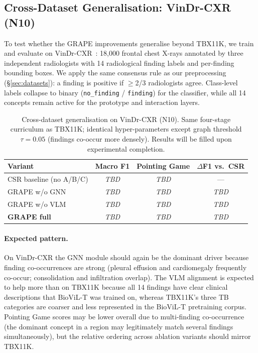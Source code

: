 \documentclass{article}
\begin{document}
\subsection{Cross-Dataset Generalisation: VinDr-CXR (N10)}
\label{sec:n10}

To test whether the GRAPE improvements generalise beyond TBX11K, we train and evaluate on VinDr-CXR~\cite{vindrcxr2022}: 18{,}000 frontal chest X-rays annotated by three independent radiologists with 14 radiological finding labels and per-finding bounding boxes.
We apply the same consensus rule as our preprocessing (§\ref{sec:datasets}): a finding is positive if $\geq$2/3 radiologists agree.
Class-level labels collapse to binary (\texttt{no\_finding} / \texttt{finding}) for the classifier, while all 14 concepts remain active for the prototype and interaction layers.

\begin{table}[t]
  \caption{Cross-dataset generalisation on VinDr-CXR (N10).
           Same four-stage curriculum as TBX11K; identical hyper-parameters except
           graph threshold $\tau=0.05$ (findings co-occur more densely).
           Results will be filled upon experimental completion.}
  \label{tab:n10}
  \centering
  \begin{tabular}{lccc}
    \toprule
    Variant & Macro F1 & Pointing Game & $\Delta$F1 vs.\ CSR \\
    \midrule
    CSR baseline (no A/B/C)   & \textit{TBD} & \textit{TBD} & — \\
    GRAPE w/o GNN             & \textit{TBD} & \textit{TBD} & \textit{TBD} \\
    GRAPE w/o VLM             & \textit{TBD} & \textit{TBD} & \textit{TBD} \\
    \textbf{GRAPE full}       & \textit{TBD} & \textit{TBD} & \textit{TBD} \\
    \bottomrule
  \end{tabular}
\end{table}

\paragraph{Expected pattern.}
On VinDr-CXR the GNN module should again be the dominant driver because finding co-occurrences are strong (pleural effusion and cardiomegaly frequently co-occur; consolidation and infiltration overlap).
The VLM alignment is expected to help more than on TBX11K because all 14 findings have clear clinical descriptions that BioViL-T was trained on, whereas TBX11K's three TB categories are coarser and less represented in the BioViL-T pretraining corpus.
Pointing Game scores may be lower overall due to multi-finding co-occurrence (the dominant concept in a region may legitimately match several findings simultaneously), but the relative ordering across ablation variants should mirror TBX11K.
\end{document}
